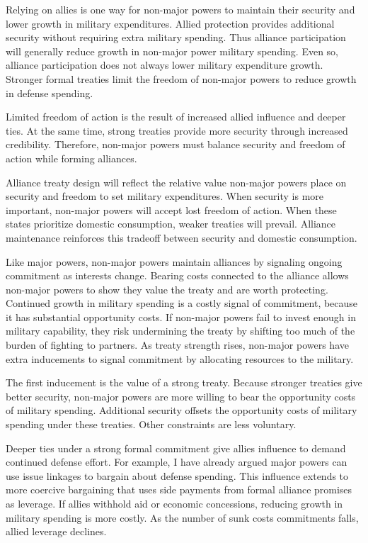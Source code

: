 \documentclass[12pt]{article}
\begin{document}
Relying on allies is one way for non-major powers to maintain their security and lower growth in military expenditures.  
Allied protection provides additional security without requiring extra military spending. 
Thus alliance participation will generally reduce growth in non-major power military spending. 
Even so, alliance participation does not always lower military expenditure growth.
Stronger formal treaties limit the freedom of non-major powers to reduce growth in defense spending. 


Limited freedom of action is the result of increased allied influence and deeper ties. 
At the same time, strong treaties provide more security through increased credibility. 
Therefore, non-major powers must balance security and freedom of action while forming alliances. 


Alliance treaty design will reflect the relative value non-major powers place on security and freedom to set military expenditures. 
When security is more important, non-major powers will accept lost freedom of action.
When these states prioritize domestic consumption, weaker treaties will prevail. 
Alliance maintenance reinforces this tradeoff between security and domestic consumption. 


Like major powers, non-major powers maintain alliances by signaling ongoing commitment as interests change. 
Bearing costs connected to the alliance allows non-major powers to show they value the treaty and are worth protecting. 
Continued growth in military spending is a costly signal of commitment, because it has substantial opportunity costs. 
If non-major powers fail to invest enough in military capability, they risk undermining the treaty by shifting too much of the burden of fighting to partners. 
As treaty strength rises, non-major powers have extra inducements to signal commitment by allocating resources to the military.


The first inducement is the value of a strong treaty.  
Because stronger treaties give better security, non-major powers are more willing to bear the opportunity costs of military spending. 
Additional security offsets the opportunity costs of military spending under these treaties.
Other constraints are less voluntary.   


Deeper ties under a strong formal commitment give allies influence to demand continued defense effort. 
For example, I have already argued major powers can use issue linkages to bargain about defense spending. 
This influence extends to more coercive bargaining that uses side payments from formal alliance promises as leverage. 
If allies withhold aid or economic concessions, reducing growth in military spending is more costly. 
As the number of sunk costs commitments falls, allied leverage declines. 
\end{document}
